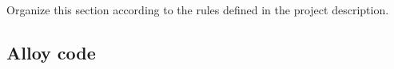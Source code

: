 Organize this section according to the rules defined in the project description. 

\subsection{Alloy code}


